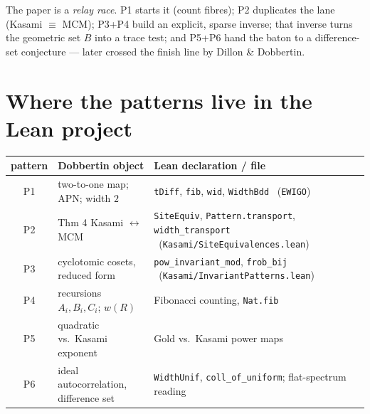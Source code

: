 \documentclass[11pt]{article}
\begin{document}
\begin{bigidea}
The paper is a \emph{relay race}. P1 starts it (count fibres); P2 duplicates the
lane (Kasami $\equiv$ MCM); P3+P4 build an explicit, sparse inverse; that inverse
turns the geometric set $B$ into a trace test; and P5+P6 hand the baton to a
difference-set conjecture --- later crossed the finish line by Dillon \& Dobbertin.
\end{bigidea}

\section*{Where the patterns live in the Lean project}

\begin{center}\small
\renewcommand{\arraystretch}{1.35}
\begin{tabular}{@{}c p{5.2cm} p{6.0cm}@{}}
\hline
\textbf{pattern} & \textbf{Dobbertin object} & \textbf{Lean declaration / file}\\
\hline
P1 & two-to-one map; APN; width $2$ & \texttt{tDiff}, \texttt{fib}, \texttt{wid}, \texttt{WidthBdd} \ (\texttt{EWIGO})\\
P2 & Thm 4 Kasami $\leftrightarrow$ MCM & \texttt{SiteEquiv}, \texttt{Pattern.transport}, \texttt{width\_transport} \ (\texttt{Kasami/SiteEquivalences.lean})\\
P3 & cyclotomic cosets, reduced form & \texttt{pow\_invariant\_mod}, \texttt{frob\_bij} \ (\texttt{Kasami/InvariantPatterns.lean})\\
P4 & recursions $A_i,B_i,C_i$; $w(R)$ & Fibonacci counting, \texttt{Nat.fib}\\
P5 & quadratic vs.\ Kasami exponent & Gold vs.\ Kasami power maps\\
P6 & ideal autocorrelation, difference set & \texttt{WidthUnif}, \texttt{coll\_of\_uniform}; flat-spectrum reading\\
\hline
\end{tabular}
\end{center}

\begin{center}
\end{center}
\end{document}
